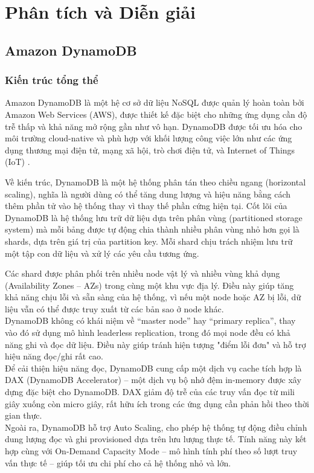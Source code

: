 \documentclass[conference]{IEEEtran}
\begin{document}
\section{Phân tích và Diễn giải}
\subsection{Amazon DynamoDB}
\subsubsection{Kiến trúc tổng thể}
Amazon DynamoDB là một hệ cơ sở dữ liệu NoSQL được quản lý hoàn toàn bởi Amazon Web Services (AWS), được thiết kế đặc biệt cho những ứng dụng cần độ trễ thấp và khả năng mở rộng gần như vô hạn. DynamoDB được tối ưu hóa cho môi trường cloud-native và phù hợp với khối lượng công việc lớn như các ứng dụng thương mại điện tử, mạng xã hội, trò chơi điện tử, và Internet of Things (IoT) \cite{aws}.

Về kiến trúc, DynamoDB là một hệ thống phân tán theo chiều ngang (horizontal scaling), nghĩa là người dùng có thể tăng dung lượng và hiệu năng bằng cách thêm phần tử vào hệ thống thay vì thay thế phần cứng hiện tại. Cốt lõi của DynamoDB là hệ thống lưu trữ dữ liệu dựa trên phân vùng (partitioned storage system) mà mỗi bảng được tự động chia thành nhiều phân vùng nhỏ hơn gọi là shards, dựa trên giá trị của partition key. Mỗi shard chịu trách nhiệm lưu trữ một tập con dữ liệu và xử lý các yêu cầu tương ứng.

Các shard được phân phối trên nhiều node vật lý và nhiều vùng khả dụng (Availability Zones – AZs) trong cùng một khu vực địa lý. Điều này giúp tăng khả năng chịu lỗi và sẵn sàng của hệ thống, vì nếu một node hoặc AZ bị lỗi, dữ liệu vẫn có thể được truy xuất từ các bản sao ở node khác.\\
DynamoDB không có khái niệm về “master node” hay “primary replica”, thay vào đó sử dụng mô hình leaderless replication, trong đó mọi node đều có khả năng ghi và đọc dữ liệu. Điều này giúp tránh hiện tượng "điểm lỗi đơn" và hỗ trợ hiệu năng đọc/ghi rất cao.\\
Để cải thiện hiệu năng đọc, DynamoDB cung cấp một dịch vụ cache tích hợp là DAX (DynamoDB Accelerator) – một dịch vụ bộ nhớ đệm in-memory được xây dựng đặc biệt cho DynamoDB. DAX giảm độ trễ của các truy vấn đọc từ mili giây xuống còn micro giây, rất hữu ích trong các ứng dụng cần phản hồi theo thời gian thực.\\
Ngoài ra, DynamoDB hỗ trợ Auto Scaling, cho phép hệ thống tự động điều chỉnh dung lượng đọc và ghi provisioned dựa trên lưu lượng thực tế. Tính năng này kết hợp cùng với On-Demand Capacity Mode – mô hình tính phí theo số lượt truy vấn thực tế – giúp tối ưu chi phí cho cả hệ thống nhỏ và lớn.
\end{document}
